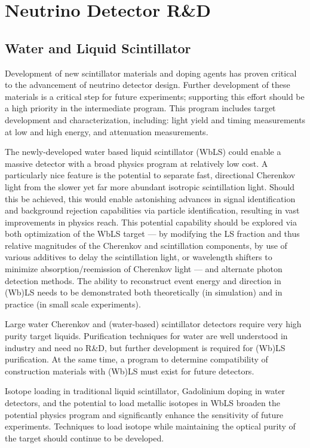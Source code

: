 \section{Neutrino Detector R\&D}
\label{sec:RandD}

\subsection{Water and Liquid Scintillator}

Development of new scintillator materials and doping agents has proven critical to the advancement 
of neutrino detector design. Further development of these materials is a critical step for future 
experiments; supporting this effort should be a high priority in the intermediate program. This program 
includes target development and characterization, including: light yield and timing measurements at 
low and high energy, and attenuation measurements.

The newly-developed water based liquid scintillator (WbLS) could enable a massive detector with a 
broad physics program at relatively low cost. A particularly nice feature is the potential to separate fast, 
directional Cherenkov light from the slower yet far more abundant isotropic scintillation light. Should this 
be achieved, this would enable astonishing advances in signal identification and background rejection 
capabilities via particle identification, resulting in vast improvements in physics reach. This potential 
capability should be explored via both optimization of the WbLS target --- by modifying the LS fraction 
and thus relative magnitudes of the Cherenkov and scintillation components, by use of various additives 
to delay the scintillation light, or wavelength shifters to minimize absorption/reemission of Cherenkov 
light --- and alternate photon detection methods. The ability to reconstruct event energy and direction in 
(Wb)LS needs to be demonstrated both theoretically (in simulation) and in practice (in small scale 
experiments).

Large water Cherenkov and (water-based) scintillator detectors require very high purity target liquids. 
Purification techniques for water are well understood in industry and need no R\&D, but further 
development is required for (Wb)LS purification. At the same time, a program to determine compatibility 
of construction materials with (Wb)LS must exist for future detectors.

Isotope loading in traditional liquid scintillator, Gadolinium doping in water detectors, and the potential 
to load metallic isotopes in WbLS broaden the potential physics program and significantly enhance the 
sensitivity of future experiments. Techniques to load isotope while maintaining the optical purity of the 
target should continue to be developed.

